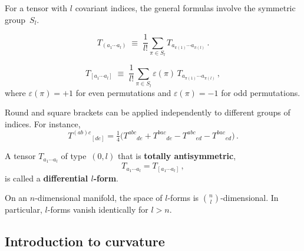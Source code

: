 For a tensor with $l$ covariant indices, the general formulas
involve the symmetric group~$S_l$.

\begin{definition}\label{def:general-sym}
  \begin{equation}\label{eq:general-sym}
    T_{(a_1\cdots a_l)}
    \;\equiv\;
    \frac{1}{l!}\sum_{\pi\in S_l}
      T_{a_{\pi(1)}\cdots a_{\pi(l)}}\,.
  \end{equation}
\end{definition}

\begin{definition}%
\label{def:general-antisym}
  \begin{equation}\label{eq:general-antisym}
    T_{[a_1\cdots a_l]}
    \;\equiv\;
    \frac{1}{l!}\sum_{\pi\in S_l}
      \varepsilon(\pi)\,
      T_{a_{\pi(1)}\cdots a_{\pi(l)}}\,,
  \end{equation}
  where $\varepsilon(\pi) = +1$ for even permutations and
  $\varepsilon(\pi) = -1$ for odd permutations.
\end{definition}

\begin{example}\label{ex:mixed-sym}
  Round and square brackets can be applied independently to
  different groups of indices.  For instance,
  \begin{equation}\label{eq:mixed-sym}
    T^{(ab)c}{}_{[de]}
    = \tfrac{1}{4}\bigl(
        T^{abc}{}_{de}
      + T^{bac}{}_{de}
      - T^{abc}{}_{ed}
      - T^{bac}{}_{ed}
    \bigr)\,.
  \end{equation}
\end{example}

\begin{definition}\label{def:diff-form}
  A tensor $T_{a_1\cdots a_l}$ of type~$(0,l)$ that is
  \textbf{totally antisymmetric},
  \[
    T_{a_1\cdots a_l} = T_{[a_1\cdots a_l]}\,,
  \]
  is called a \textbf{differential $l$-form}.
\end{definition}

\begin{remark}
  On an $n$-dimensional manifold, the space of $l$-forms is
  $\binom{n}{l}$-dimensional.  In particular, $l$-forms vanish
  identically for $l > n$.
\end{remark}

\subsection{Introduction to curvature}\label{sec:curvature-intro}

